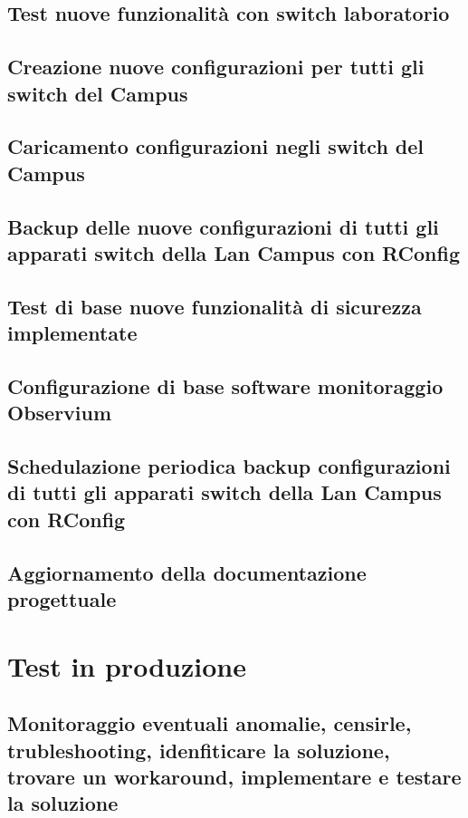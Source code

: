 \documentclass[Tesi.tex]{subfiles}
\begin{document}
\subsection{Test nuove funzionalità con switch laboratorio} 
\subsection{Creazione nuove configurazioni per tutti gli switch del Campus} 
\subsection{Caricamento configurazioni negli switch del Campus} 
\subsection{Backup delle nuove configurazioni di tutti gli apparati switch della Lan Campus con RConfig} 
\subsection{Test di base nuove funzionalità di sicurezza implementate} 
\subsection{Configurazione di base software monitoraggio Observium}
\subsection{Schedulazione periodica backup configurazioni di tutti gli apparati switch della Lan Campus con RConfig}
\subsection{Aggiornamento della documentazione progettuale}



\newpage
\section{Test in produzione}
\subsection{Monitoraggio eventuali anomalie, censirle, trubleshooting, idenfiticare la soluzione, trovare un workaround, implementare e testare la soluzione}
\end{document}
